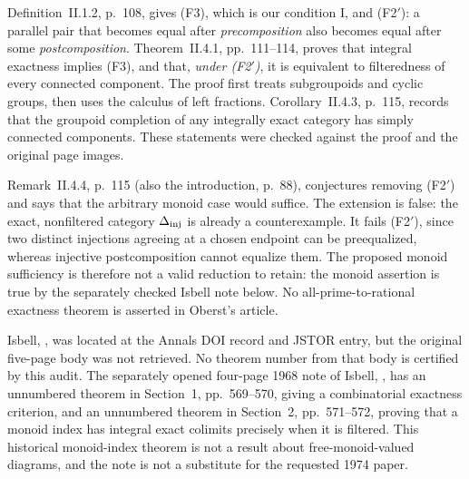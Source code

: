Definition~II.1.2, p.~108, gives (F3), which is our condition I,
and (F2$'$): a parallel pair that becomes equal after
\emph{precomposition} also becomes equal after some
\emph{postcomposition}. Theorem~II.4.1, pp.~111--114, proves that
integral exactness implies (F3), and that, \emph{under (F2$'$)}, it
is equivalent to filteredness of every connected component.
The proof first treats subgroupoids and cyclic groups, then uses
the calculus of left fractions. Corollary~II.4.3, p.~115, records
that the groupoid completion of any integrally exact category has
simply connected components. These statements were checked
against the proof and the original page images.

Remark~II.4.4, p.~115 (also the introduction, p.~88), conjectures
removing (F2$'$) and says that the arbitrary monoid case would
suffice. The extension is false: the exact, nonfiltered category
$\Delta_{\rm inj}$ is already a counterexample. It fails
(F2$'$), since two distinct injections agreeing at a chosen
endpoint can be preequalized, whereas injective postcomposition
cannot equalize them. The proposed monoid sufficiency is therefore
not a valid reduction to retain: the monoid assertion is true by
the separately checked Isbell note below. No all-prime-to-rational
exactness theorem is asserted in Oberst's article.

Isbell, \cite{ABIsbell1974}, was located at the Annals DOI record
and JSTOR entry, but the original five-page body was not retrieved.
No theorem number from that body is certified by this audit.
The separately opened four-page 1968 note of Isbell,
\cite{ABIsbell1968}, has an unnumbered theorem in Section~1,
pp.~569--570, giving a combinatorial exactness criterion, and an
unnumbered theorem in Section~2, pp.~571--572, proving that a
monoid index has integral exact colimits precisely when it is
filtered. This historical monoid-index theorem is not a result
about free-monoid-valued diagrams, and the note is not a substitute
for the requested 1974 paper.

